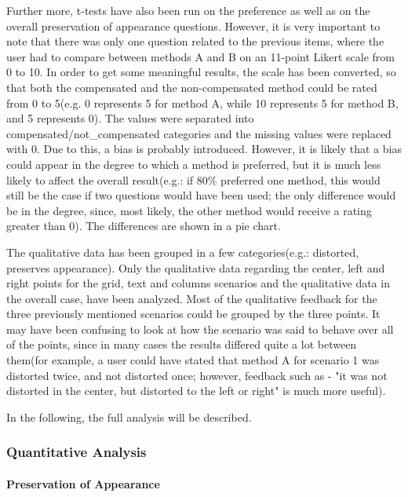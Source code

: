 \documentclass[]{article}
\begin{document}
Further more, t-tests have also been run on the preference as well as on the overall preservation of appearance questions. However, it is very important to note that there was only one question related to the previous items, where the user had to compare between methods A and B on an 11-point Likert scale from 0 to 10. In order to get some meaningful results, the scale has been converted, so that both the compensated and the non-compensated method could be rated from 0 to 5(e.g. 0 represents 5 for method A, while 10 represents 5 for method B, and 5 represents 0). The values were separated into compensated/not\_compensated categories and the missing values were replaced with 0. Due to this, a bias is probably introduced. However, it is likely that a bias could appear in the degree to which a method is preferred, but it is much less likely to affect the overall result(e.g.: if 80\% preferred one method, this would still be the case if two questions would have been used; the only difference would be in the degree, since, most likely, the other method would receive a rating greater than 0). The differences are shown in a pie chart.

The qualitative data has been grouped in a few categories(e.g.: distorted, preserves appearance). Only the qualitative data regarding the center, left and right points for the grid, text and columns scenarios and the qualitative data in the overall case, have been analyzed. Most of the qualitative feedback for the three previously mentioned scenarios could be grouped by the three points. It may have been confusing to look at how the scenario was said to behave over all of the points, since in many cases the results differed quite a lot between them(for example, a user could have stated that method A for scenario 1 was distorted twice, and not distorted once; however, feedback such as - "it was not distorted in the center, but distorted to the left or right" is much more useful).

In the following, the full analysis will be described.

\subsubsection{Quantitative Analysis}
\paragraph{Preservation of Appearance}\mbox{}\\
\end{document}
